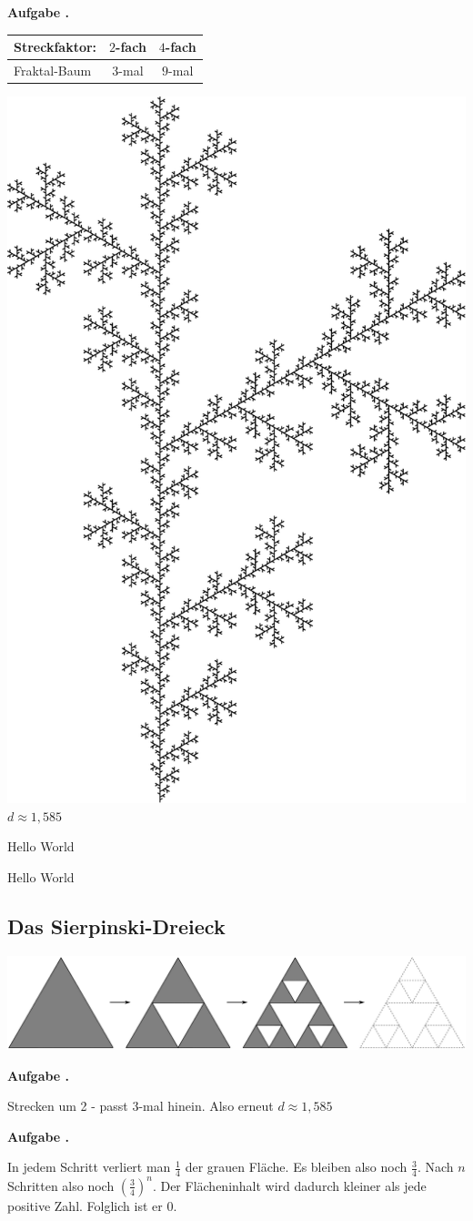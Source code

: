 \documentclass[a4paper,ngerman,12pt]{scrartcl}
\theoremstyle{definition}
\theoremstyle{plain}
\theoremstyle{remark}
\newlength{\aufgabenskip}
\newcounter{aufgabennummer}
\newenvironment{aufgabe}[1]{
  \addtocounter{aufgabennummer}{1}
  \textbf{Aufgabe \theaufgabennummer.} \emph{#1} \par
}{\vspace{\aufgabenskip}}
\begin{document}
\begin{aufgabe}{}
	\begin{minipage}[t]{0.5\textwidth}
			\renewcommand{\arraystretch}{2}
			\begin{tabular}{l||c|c}
				Streckfaktor:& $2$-fach & $4$-fach \\\hline\hline
				Fraktal-Baum & $3$-mal & $9$-mal \\	
			\end{tabular}
	\end{minipage}
 

		
	\includegraphics[width=.2\textwidth]{Bilder/Baum.pdf}
	$d \approx 1,585$
\end{aufgabe}

	\begin{minipage}[h]{5cm}
		Hello World
	\end{minipage}
	
	\begin{minipage}[h]{5cm}
		Hello World
	\end{minipage}

\subsection{Das Sierpinski-Dreieck}

\begin{center}
	\includegraphics[width=.7\textwidth]{Bilder/Sierpinski-Konstruktion.pdf}
\end{center}

\begin{aufgabe}{}\label{aufgabe:Sierpinski-Flaeche}
	Strecken um 2 - passt 3-mal hinein. Also erneut $d \approx 1,585$
\end{aufgabe}

\begin{aufgabe}{}
	In jedem Schritt verliert man $\frac{1}{4}$ der grauen Fläche. Es bleiben also noch $\frac{3}{4}$. Nach $n$ Schritten also noch $\left(\frac{3}{4}\right)^n$. Der Flächeninhalt wird dadurch kleiner als jede positive Zahl. Folglich ist er $0$.
\end{aufgabe}
\end{document}
